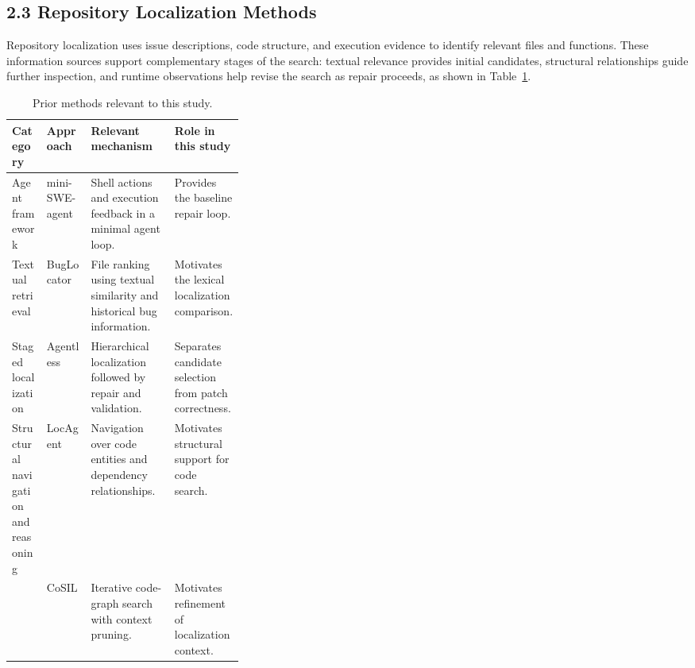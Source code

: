 \documentclass[11pt]{article}
\begin{document}
\subsection*{2.3 Repository Localization Methods}

Repository localization uses issue descriptions, code structure,
and execution evidence to identify relevant files and functions.
These information sources support complementary stages of the
search: textual relevance provides initial candidates, structural
relationships guide further inspection, and runtime observations
help revise the search as repair proceeds, as shown in Table~\ref{tab:rw-positioning}.

\begin{table}[H]
\centering
\small
\setlength{\tabcolsep}{3pt}
\renewcommand{\arraystretch}{1.18}
\caption{Prior methods relevant to this study.}
\label{tab:rw-positioning}

\begin{tabularx}{\linewidth}{
    @{}
    >{\raggedright\arraybackslash}p{0.15\linewidth}
    >{\raggedright\arraybackslash}p{0.19\linewidth}
    >{\raggedright\arraybackslash}X
    >{\raggedright\arraybackslash}X
    @{}
}
\toprule
Category & Approach & Relevant mechanism & Role in this study \\
\midrule

Agent framework
& mini-SWE-agent \cite{minisweagent}
& Shell actions and execution feedback in a minimal agent loop.
& Provides the baseline repair loop. \\

\midrule

Textual retrieval
& BugLocator \cite{zhou2012buglocator}
& File ranking using textual similarity and historical bug information.
& Motivates the lexical localization comparison. \\

\midrule

Staged localization
& Agentless \cite{xia2024agentless}
& Hierarchical localization followed by repair and validation.
& Separates candidate selection from patch correctness. \\

\midrule

Structural navigation and reasoning
& LocAgent \cite{chen2025locagent}
& Navigation over code entities and dependency relationships.
& Motivates structural support for code search. \\

& CoSIL \cite{jiang2025cosil}
& Iterative code-graph search with context pruning.
& Motivates refinement of localization context. \\


\end{tabularx}
\end{table}
\end{document}
